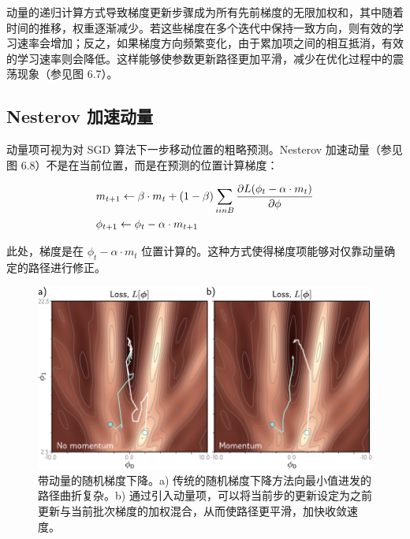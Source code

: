 \documentclass[lang=cn,newtx,10pt,scheme=chinese]{elegantbook}
\begin{document}
动量的递归计算方式导致梯度更新步骤成为所有先前梯度的无限加权和，其中随着时间的推移，权重逐渐减少。若这些梯度在多个迭代中保持一致方向，则有效的学习速率会增加；反之，如果梯度方向频繁变化，由于累加项之间的相互抵消，有效的学习速率则会降低。这样能够使参数更新路径更加平滑，减少在优化过程中的震荡现象（参见图 6.7）。

\subsection{Nesterov 加速动量}
动量项可视为对 SGD 算法下一步移动位置的粗略预测。Nesterov 加速动量（参见图 6.8）不是在当前位置，而是在预测的位置计算梯度：


\begin{align}
& m_{t+1} \leftarrow \beta \cdot m_t + (1 - \beta) \sum_{i in B} \frac{\partial L(\phi_t - \alpha \cdot m_t)}{\partial \phi} \notag \\
& \phi_{t+1} \leftarrow \phi_t - \alpha \cdot m_{t+1} 
\end{align} 


此处，梯度是在 \(\phi_t - \alpha \cdot m_t\) 位置计算的。这种方式使得梯度项能够对仅靠动量确定的路径进行修正。

\begin{figure}[ht!]
\centering
\includegraphics[width=0.7\linewidth]{PDFFigures/UDLChap6PDF/TrainMomentum.pdf}
\caption{带动量的随机梯度下降。a) 传统的随机梯度下降方法向最小值进发的路径曲折复杂。b) 通过引入动量项，可以将当前步的更新设定为之前更新与当前批次梯度的加权混合，从而使路径更平滑，加快收敛速度。}
\end{figure}
\end{document}
